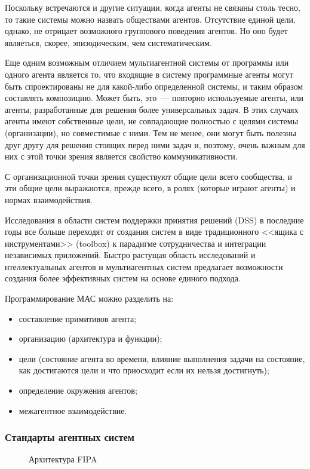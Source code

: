 Поскольку встречаются и другие ситуации, когда агенты не связаны столь тесно, то такие системы можно назвать обществами агентов. Отсутствие единой цели, однако, не отрицает возможного группового поведения агентов. Но оно будет являеться, скорее, эпизодическим, чем систематическим.

Еще одним возможным отличием мультиагентной системы от программы или одного агента является то, что входящие в систему программные агенты могут быть спроектированы не для какой-либо определенной системы, и таким образом составлять композицию. Может быть, это~--- повторно используемые агенты, или агенты, разработанные для решения более универсальных задач. В этих случаях агенты имеют собственные цели, не совпадающие полностью с целями системы (организации), но совместимые с ними. Тем не менее, они могут быть полезны друг другу для решения стоящих перед ними задач и, поэтому, очень важным для них с этой точки зрения является свойство коммуникативности.

С организационной точки зрения существуют общие цели всего сообщества, и эти общие цели выражаются, прежде всего, в ролях (которые играют агенты) и нормах взаимодействия.

Исследования в области систем поддержки принятия решений (DSS) в последние годы все больше переходят от создания систем в виде традиционного <<ящика с инструментами>> (toolbox) к парадигме сотрудничества и интеграции независимых приложений. Быстро растущая область исследований и нтеллектуальных агентов и мультиагентных систем предлагает возможности создания более эффективных систем на основе единого подхода.

Программирование МАС можно разделить на:
\begin{itemize}
\item составление примитивов агента;
\item организацию (архитектура и функции);
\item цели (состояние агента во времени, влияние выполнения задачи на состояние, как достигаются цели и что приосходит если их нельзя достигнуть);
\item определение окружения агентов;
\item межагентное взаимодействие.
\end{itemize}

\subsubsection{Стандарты агентных систем}
\begin{figure}[h]
\caption{Архитектура FIPA}
\label{1:fipa}
\end{figure}

